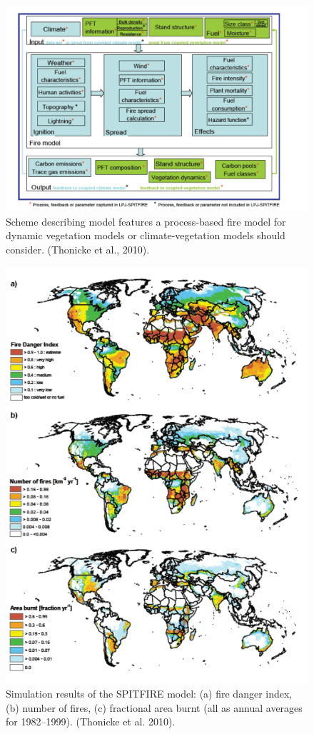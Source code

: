\documentclass[12pt,oneside]{book}
\begin{document}
\begin{figure}

{\centering \includegraphics[width=0.8\linewidth]{figures/chap8/f85_spitfire} 

}

\caption{Scheme describing model features a process-based fire model for dynamic vegetation models or climate-vegetation models should consider. (Thonicke et al., 2010).}\label{fig:f85}
\end{figure}

\begin{figure}

{\centering \includegraphics[width=0.8\linewidth]{figures/chap8/f86_spitfire_output} 

}

\caption{Simulation results of the SPITFIRE model: (a) fire danger index, (b) number of fires, (c) fractional area burnt (all as annual averages for 1982–1999). (Thonicke et al. 2010).}\label{fig:f86}
\end{figure}
\end{document}
